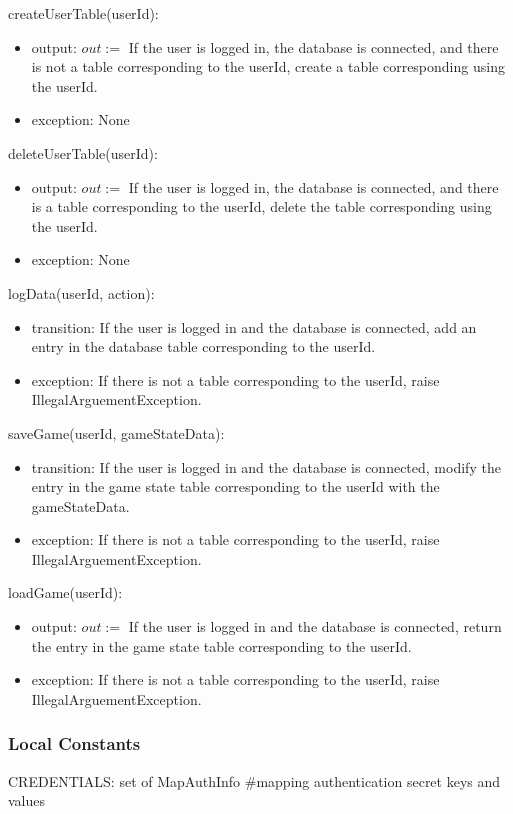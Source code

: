 \documentclass[12pt, titlepage]{article}
\begin{document}
\noindent createUserTable(userId):
\begin{itemize}
\item output: $out := $ If the user is logged in, the database is connected, and there is not a table corresponding to the userId, create a table corresponding using the userId.
\item exception: None
\end{itemize}

\noindent deleteUserTable(userId):
\begin{itemize}
\item output: $out := $ If the user is logged in, the database is connected, and there is a table corresponding to the userId, delete the table corresponding using the userId.
\item exception: None
\end{itemize}

\noindent logData(userId, action):
\begin{itemize}
\item transition: If the user is logged in and the database is connected, add an entry in the database table corresponding to the userId.
\item exception: If there is not a table corresponding to the userId, raise IllegalArguementException.
\end{itemize}

\noindent saveGame(userId, gameStateData):
\begin{itemize}
\item transition: If the user is logged in and the database is connected, modify the entry in the game state table corresponding to the userId with the gameStateData.
\item exception: If there is not a table corresponding to the userId, raise IllegalArguementException.
\end{itemize}

\noindent loadGame(userId):
\begin{itemize}
\item output: $out := $ If the user is logged in and the database is connected, return the entry in the game state table corresponding to the userId.
\item exception: If there is not a table corresponding to the userId, raise IllegalArguementException.
\end{itemize}

\subsubsection{Local Constants}
CREDENTIALS: set of MapAuthInfo \#mapping authentication secret keys and values\\
\medskip
\newpage
\end{document}
